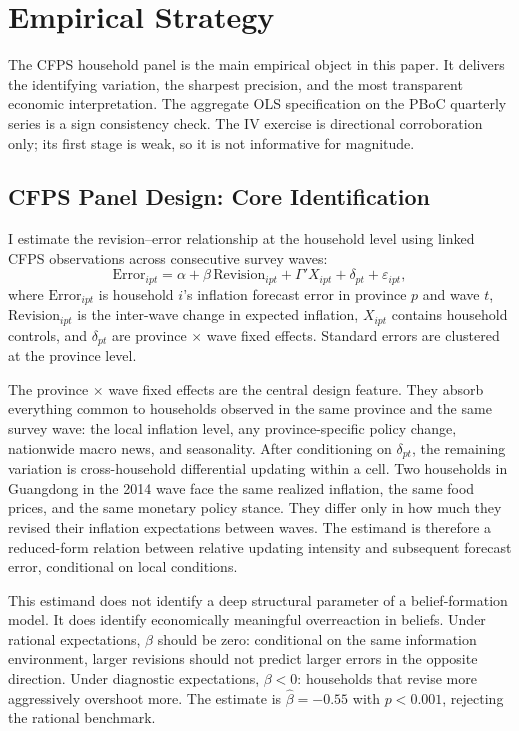 \section{Empirical Strategy}\label{sec:identification}

The CFPS household panel is the main empirical object in this paper. It
delivers the identifying variation, the sharpest precision, and the most
transparent economic interpretation. The aggregate OLS specification on the
PBoC quarterly series is a sign consistency check. The IV exercise is
directional corroboration only; its first stage is weak, so it is
not informative for magnitude.

\subsection{CFPS Panel Design: Core Identification}

I estimate the revision--error relationship at the household level using
linked CFPS observations across consecutive survey waves:
\begin{equation}\label{eq:cfps_panel}
  \text{Error}_{ipt}
  = \alpha + \beta \,\text{Revision}_{ipt}
  + \Gamma' X_{ipt} + \delta_{pt} + \varepsilon_{ipt},
\end{equation}
where $\text{Error}_{ipt}$ is household $i$'s inflation forecast error in
province $p$ and wave $t$, $\text{Revision}_{ipt}$ is the inter-wave
change in expected inflation, $X_{ipt}$ contains household controls, and
$\delta_{pt}$ are province $\times$ wave fixed effects. Standard errors are
clustered at the province level.

The province $\times$ wave fixed effects are the central design feature. They
absorb everything common to households observed in the same province and
the same survey wave: the local inflation level, any province-specific
policy change, nationwide macro news, and seasonality. After conditioning
on $\delta_{pt}$, the remaining variation is cross-household differential
updating within a cell. Two households in Guangdong in the 2014 wave face
the same realized inflation, the same food prices, and the same monetary
policy stance. They differ only in how much they revised their inflation
expectations between waves. The estimand is therefore a reduced-form
relation between relative updating intensity and subsequent forecast error,
conditional on local conditions.

This estimand does not identify a deep structural parameter of a
belief-formation model. It does identify economically meaningful
overreaction in beliefs. Under rational expectations, $\beta$ should be
zero: conditional on the same information environment, larger revisions
should not predict larger errors in the opposite direction. Under
diagnostic expectations, $\beta < 0$: households that revise more
aggressively overshoot more. The estimate is $\hat{\beta} = -0.55$ with
$p < 0.001$, rejecting the rational benchmark.

